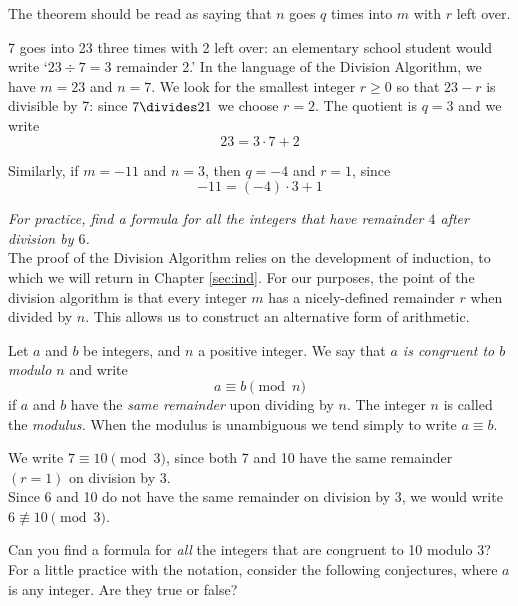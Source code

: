 \noindent The theorem should be read as saying that $n$ goes $q$ times into $m$ with $r$ left over. 

\begin{examples}
\item 7 goes into 23 three times with 2 left over: an elementary school student would write `$23\div 7=3$ remainder 2.' In the language of the Division Algorithm, we have $m=23$ and $n=7$. We look for the smallest integer $r\ge 0$ so that $23-r$ is divisible by 7: since $7\divides 21$ we choose $r=2$. The quotient is $q=3$ and we write
\[23=3\cdot 7+2\]
\item Similarly, if $m=-11$ and $n=3$, then $q=-4$ and $r=1$, since
\[-11=(-4)\cdot 3+1\] 
\end{examples}


\noindent\emph{For practice, find a formula for all the integers that have remainder $4$ after division by $6$.}\\


\noindent The proof of the Division Algorithm relies on the development of induction, to which we will return in Chapter \ref{sec:ind}. For our purposes, the point of the division algorithm is that every integer $m$ has a nicely-defined remainder $r$ when divided by $n$. This allows us to construct an alternative form of arithmetic.

\begin{defn}
Let $a$ and $b$ be integers, and $n$ a positive integer. We say that \emph{$a$ is congruent to $b$ modulo $n$} and write
\[a\equiv b\pmod n\]
if $a$ and $b$ have the \emph{same remainder} upon dividing by $n$. The integer $n$ is called the \emph{modulus.} When the modulus is unambiguous we tend simply to write $a\equiv b$.
\end{defn}

\begin{exs}
We write $7\equiv 10\pmod 3$, since both 7 and 10 have the same remainder $(r=1)$ on division by $3$.\\
Since 6 and 10 do not have the same remainder on division by 3, we would write $6\not\equiv 10\pmod 3$.
\end{exs}

\noindent Can you find a formula for \emph{all} the integers that are congruent to 10 modulo 3?\\

\noindent For a little practice with the notation, consider the following conjectures, where $a$ is any integer. Are they true or false? 

